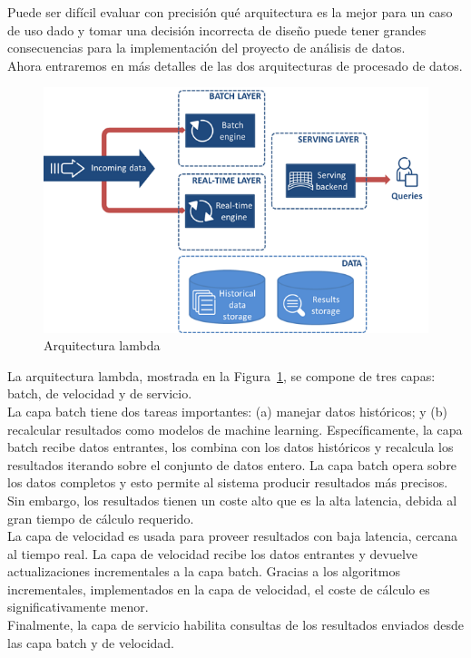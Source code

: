 \documentclass[12pt,a4paper,twoside,openright,titlepage,final]{article}
\begin{document}
Puede ser difícil evaluar con precisión qué arquitectura es la mejor para un caso de uso dado y tomar una decisión incorrecta de diseño puede tener grandes consecuencias para la implementación del proyecto de análisis de datos.\\

Ahora entraremos en más detalles de las dos arquitecturas de procesado de datos.\\

\begin{figure}[tbph!]
\centering
\includegraphics[width=0.7\linewidth]{imagenes/Lambda}
\caption{Arquitectura lambda}
\label{fig:Lambda}
\end{figure}

La arquitectura lambda, mostrada en la Figura~\ref{fig:Lambda}, se compone de tres capas: batch, de velocidad y de servicio.\\

La capa batch tiene dos tareas importantes: (a) manejar datos históricos; y (b) recalcular resultados como modelos de machine learning. Específicamente, la capa batch recibe datos entrantes, los combina con los datos históricos y recalcula los resultados iterando sobre el conjunto de datos entero. La capa batch opera sobre los datos completos y esto permite al sistema producir resultados más precisos. Sin embargo, los resultados tienen un coste alto que es la alta latencia, debida al gran tiempo de cálculo requerido.\\

La capa de velocidad es usada para proveer resultados con baja latencia, cercana al tiempo real. La capa de velocidad recibe los datos entrantes y devuelve actualizaciones incrementales a la capa batch. Gracias a los algoritmos incrementales, implementados en la capa de velocidad, el coste de cálculo es significativamente menor.\\

Finalmente, la capa de servicio habilita consultas de los resultados enviados desde las capa batch y de velocidad.\\
\end{document}
